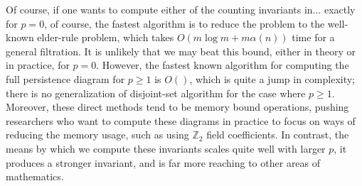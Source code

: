 \documentclass[12pt]{article}
\numberwithin{equation}{section}
\newcommand{\+}{%
	\raisebox{0.18ex}{\scaleobj{0.55}{+}}
}
\newtheorem{definition}{Definition}
\theoremstyle{definition}
\begin{document}
Of course, if one wants to compute either of the counting invariants in... exactly for $p = 0$, of course, the fastest algorithm is to reduce the problem to the well-known elder-rule problem, which takes $O(m \log m + m \alpha(n))$ time for a general filtration. It is unlikely that we may beat this bound, either in theory or in practice, for $p = 0$.
However, the fastest known algorithm for computing the full persistence diagram for $p \geq 1$ is $O()$, which is quite a jump in complexity; there is no generalization of disjoint-set algorithm for the case where $p \geq 1$. 
Moreover, these direct methods tend to be memory bound operations, pushing researchers who want to compute these diagrams in practice to focus on ways of reducing the memory usage, such as using $\mathbb{Z}_2$ field coefficients. 
In contrast, the means by which we compute these invariants scales quite well with larger $p$, it produces a stronger invariant, and is far more reaching to other areas of mathematics. 




% 
\end{document}
